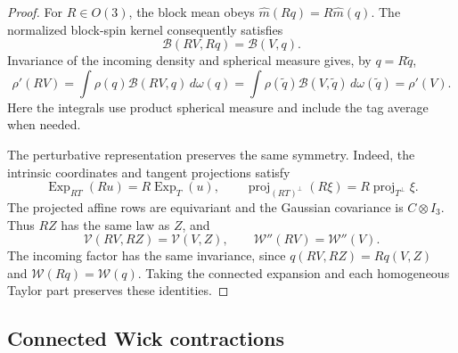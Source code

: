 \documentclass[11pt]{article}
\newcommand{\Exp}{\operatorname{Exp}}
\newcommand{\proj}{\operatorname{proj}}
\numberwithin{equation}{section}
\theoremstyle{definition}
\theoremstyle{plain}
\begin{document}
\begin{proof}
For $R\in O(3)$, the block mean obeys
$\widehat m(Rq)=R\widehat m(q)$.  %
The normalized block-spin kernel consequently satisfies
\begin{equation}
 \mathcal B(RV,Rq)=\mathcal B(V,q).
\end{equation}
Invariance of the incoming density and spherical measure gives,
by $q=R\widetilde q$,
\begin{equation}
 \rho'(RV)
 =\int\rho(q)\mathcal B(RV,q)\,d\omega(q)
 =\int\rho(\widetilde q)\mathcal B(V,\widetilde q)
                      \,d\omega(\widetilde q)
 =\rho'(V).
\end{equation}
Here the integrals use product spherical measure and include the
tag average when needed.

The perturbative representation preserves the same symmetry.
Indeed, the intrinsic coordinates and tangent projections satisfy
\begin{equation}
 \Exp_{RT}(Ru)=R\Exp_T(u),\qquad
 \proj_{(RT)^\perp}(R\xi)=R\proj_{T^\perp}\xi.
\end{equation}
The projected affine rows are equivariant and the Gaussian covariance
is $C\otimes I_3$.  Thus $RZ$ has the same law as $Z$, and
\begin{equation}
 \mathcal V(RV,RZ)=\mathcal V(V,Z),\qquad
 \mathcal W''(RV)=\mathcal W''(V).
\end{equation}
The incoming factor has the same invariance, since
$q(RV,RZ)=Rq(V,Z)$ and $\mathcal W(Rq)=\mathcal W(q)$.
Taking the connected expansion and each homogeneous Taylor part
preserves these identities.
\end{proof}

\subsection{Connected Wick contractions}
\label{subsec:pert-connected}
\end{document}
